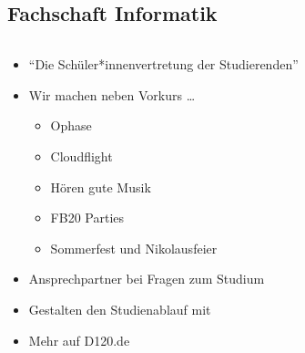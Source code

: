 \subsection*{Fachschaft Informatik}
\begin{frame}
    \slidehead
    \begin{columns}[b]
        \begin{column}{ .6\textwidth }
            \begin{itemize}[<+->]
                \item \enquote{Die Schüler*innenvertretung der Studierenden}
                \item Wir machen neben Vorkurs \dots
                    \begin{itemize}
                        \item Ophase
                        \item Cloudflight
                        \item Hören gute Musik
                        \item FB20 Parties
                        \item Sommerfest und Nikolausfeier
                    \end{itemize}
                \item Ansprechpartner bei Fragen zum Studium
                \item Gestalten den Studienablauf mit
                    \vspace{.4cm}
                \item {\centering \huge Mehr auf D120.de}
            \end{itemize}
        \end{column}%
        \begin{column}{ .4\textwidth }
            \texttt{[image: media/bildmarke\_ohne\_rand\\IfDarkModeT\{-dark]}.png}
        \end{column}
    \end{columns}
\end{frame}

